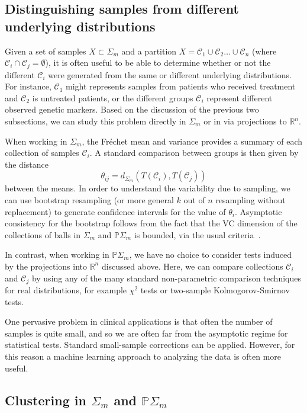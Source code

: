 \documentclass[a4paper,11pt]{article}
\newcommand{\aC}{\mathcal{C}}
\begin{document}
\subsection{Distinguishing samples from different underlying distributions}

Given a set of samples $X \subset \Sigma_m$ and a partition $X = \aC_1 \cup \aC_2 \ldots \cup \aC_n$ (where $\aC_i \cap \aC_j = \emptyset$), it is often useful to be able to determine whether or not the different $\aC_i$ were generated from the same or different underlying distributions.
For instance, $\aC_1$ might represents samples from patients who received treatment and $\aC_2$ is untreated patients, or the different groups $\aC_i$ represent different observed genetic markers.
Based on the discussion of the previous two subsections, we can study this problem directly in $\Sigma_m$ or in via projections to $\mathbb{R}^n$.

When working in $\Sigma_m$, the Fr\'echet mean and variance provides a summary of each collection of samples $\aC_i$.
A standard comparison between groups is then given by the distance 
\[
\theta_{ij} = d_{\Sigma_m}(T(\aC_i), T(\aC_j))
\]
between the means.
In order to understand the variability due to sampling, we can use bootstrap resampling (or more general $k$ out of $n$ resampling without replacement) to generate confidence intervals for the value of $\theta_i$.
Asymptotic consistency for the bootstrap follows from the fact that the VC dimension of the collections of balls in $\Sigma_m$ and $\mathbb{P}\Sigma_m$ is bounded, via the usual criteria~\cite{Gine1984, Gine1986, Gine1990}.

In contrast, when working in $\mathbb{P}\Sigma_m$, we have no choice to consider tests induced by the projections into $\mathbb{R}^n$ discussed above.
Here, we can compare collections $\aC_i$ and $\aC_j$ by using any of the many standard non-parametric comparison techniques for real distributions, for example $\chi^2$ tests or two-sample Kolmogorov-Smirnov tests.

One pervasive problem in clinical applications is that often the number of samples is quite small, and so we are often far from the asymptotic regime for statistical tests.
Standard small-sample corrections can be applied.
However, for this reason a machine learning approach to analyzing the data is often more useful.

\subsection{Clustering in $\Sigma_m$ and $\mathbb{P}\Sigma_m$}
\end{document}
